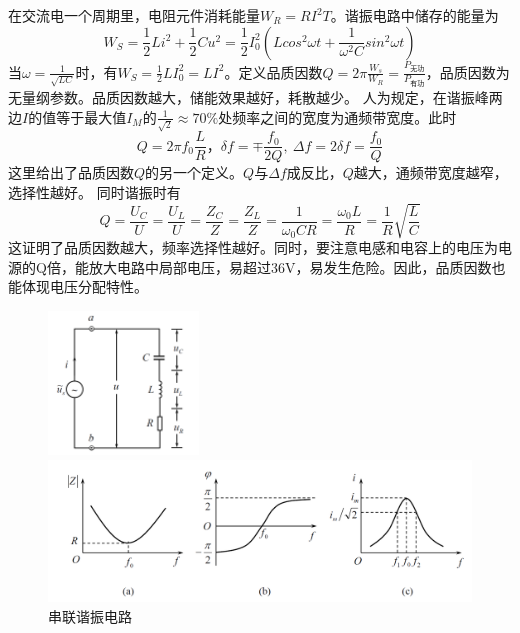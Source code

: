 \documentclass[UTF8]{article}
\begin{document}
\begin{enumerate}
    \newline \hspace*{2em}在交流电一个周期里，电阻元件消耗能量$W_R=RI^2T$。谐振电路中储存的能量为
        \[W_S=\frac{1}{2}Li^2+\frac{1}{2}Cu^2=\frac{1}{2}I_0^2\left( Lcos^2\omega t+\frac{1}{\omega^2C}sin^2\omega t \right)\]
    \hspace*{2em} 当$\omega=\frac{1}{\sqrt{LC}}$时，有$W_S=\frac{1}{2}LI_0^2=LI^2$。定义品质因数$Q=2\pi\frac{W_s}{W_R}=\frac{P_{ \text{无功} }}{P_{ \text{有功} }}$，品质因数为无量纲参数。品质因数越大，储能效果越好，耗散越少。
    \newline \hspace*{2em} 人为规定，在谐振峰两边$I$的值等于最大值$I_M$的$\frac{1}{\sqrt2}\approx70\%$处频率之间的宽度为通频带宽度。此时
    \[Q=2\pi f_0\frac{L}{R}，\delta f=\mp\frac{f_0}{2Q},\ \Delta f=2\delta f=\frac{f_0}{Q}\]
    \hspace*{2em} 这里给出了品质因数$Q$的另一个定义。$Q$与$\Delta f$成反比，$Q$越大，通频带宽度越窄，选择性越好。
    \newline \hspace*{2em} 同时谐振时有
    \[Q=\frac{U_C}{U}=\frac{U_L}{U}=\frac{Z_C}{Z}=\frac{Z_L}{Z}=\frac{1}{\omega_0CR}=\frac{\omega_0L}{R}=\frac{1}{R}\sqrt{\frac{L}{C}}\]
    \hspace*{2em} 这证明了品质因数越大，频率选择性越好。同时，要注意电感和电容上的电压为电源的Q倍，能放大电路中局部电压，易超过36V，易发生危险。因此，品质因数也能体现电压分配特性。
    \begin{figure}[H]
        \begin{minipage}[t]{0.3\linewidth}
            \centering
            \includegraphics[width=4cm]{Fig/2.png}
            \caption{串联谐振电路}
        \end{minipage}
        \begin{minipage}[t]{0.69\linewidth}
            \centering
            \includegraphics[width=11.5cm]{Fig/3.png}

\end{minipage}
\end{figure}
\end{enumerate}
\end{document}
